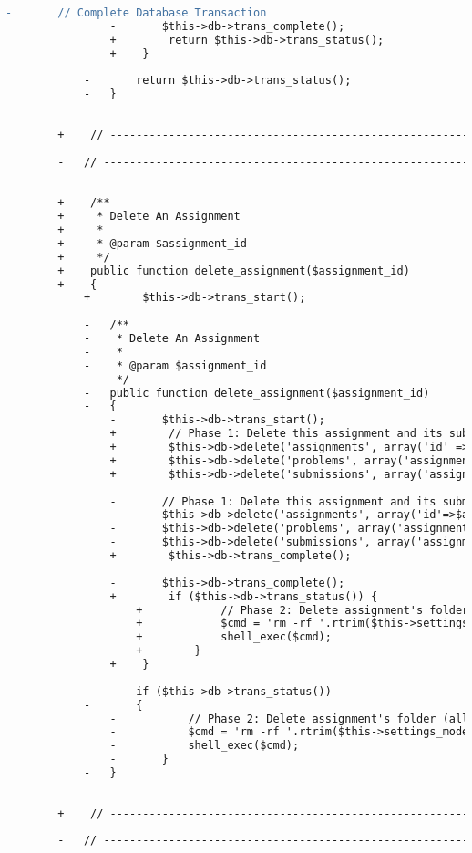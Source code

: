 \begin{lstlisting}[language=diff, caption=Perubahan pada kode Assignment\_model.php]
				-		// Complete Database Transaction
				-		$this->db->trans_complete();
				+        return $this->db->trans_status();
				+    }
			
			-		return $this->db->trans_status();
			-	}
		
		
		+    // ------------------------------------------------------------------------
		
		-	// ------------------------------------------------------------------------
		
		
		+    /**
		+     * Delete An Assignment
		+     *
		+     * @param $assignment_id
		+     */
		+    public function delete_assignment($assignment_id)
		+    {
			+        $this->db->trans_start();
			
			-	/**
			-	 * Delete An Assignment
			-	 *
			-	 * @param $assignment_id
			-	 */
			-	public function delete_assignment($assignment_id)
			-	{
				-		$this->db->trans_start();
				+        // Phase 1: Delete this assignment and its submissions from database
				+        $this->db->delete('assignments', array('id' => $assignment_id));
				+        $this->db->delete('problems', array('assignment' => $assignment_id));
				+        $this->db->delete('submissions', array('assignment' => $assignment_id));
				
				-		// Phase 1: Delete this assignment and its submissions from database
				-		$this->db->delete('assignments', array('id'=>$assignment_id));
				-		$this->db->delete('problems', array('assignment'=>$assignment_id));
				-		$this->db->delete('submissions', array('assignment'=>$assignment_id));
				+        $this->db->trans_complete();
				
				-		$this->db->trans_complete();
				+        if ($this->db->trans_status()) {
					+            // Phase 2: Delete assignment's folder (all test cases and submitted codes)
					+            $cmd = 'rm -rf '.rtrim($this->settings_model->get_setting('assignments_root'), '/').'/assignment_'.$assignment_id;
					+            shell_exec($cmd);
					+        }
				+    }
			
			-		if ($this->db->trans_status())
			-		{
				-			// Phase 2: Delete assignment's folder (all test cases and submitted codes)
				-			$cmd = 'rm -rf '.rtrim($this->settings_model->get_setting('assignments_root'), '/').'/assignment_'.$assignment_id;
				-			shell_exec($cmd);
				-		}
			-	}
		
		
		+    // ------------------------------------------------------------------------
		
		-	// ------------------------------------------------------------------------
		

\end{lstlisting}
